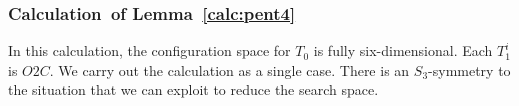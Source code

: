 \subsubsection{Calculation~of Lemma~\ref{calc:pent4}} 
In this calculation, the configuration space for $T_0$ is fully six-dimensional.  Each $T^i_1$ is $O2C$.
We carry out the calculation as a single case.  There is an $S_3$-symmetry to the situation that
we can exploit to reduce the search space.
